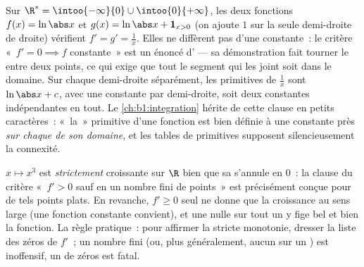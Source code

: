\begin{example}\label{ex:b1:derivative:intervalmatters}
Sur $\R^* = \intoo{-\infty}{0} \cup \intoo{0}{+\infty}$, les deux fonctions
$f(x) = \ln\abs x$ et $g(x) = \ln\abs x + \mathbf{1}_{x>0}$
(on ajoute $1$ sur la seule demi-droite de droite) vérifient $f' = g' =
\frac1x$. Elles ne diffèrent pas d'une constante~: le critère
«~$f' = 0 \implies f$ constante~» est un énoncé d'\emph{}
--- sa démonstration fait tourner le  entre
deux points, ce qui exige que tout le segment qui les joint soit dans le
domaine. Sur chaque demi-droite séparément, les primitives de
$\frac1x$ sont $\ln\abs x + c$, avec une constante par demi-droite,
soit deux constantes indépendantes en tout. Le \cref{ch:b1:integration}
hérite de cette clause en petits caractères~: «~la~» primitive d'une fonction
est bien définie à une constante près \emph{sur chaque  de son
domaine}, et les tables de primitives supposent silencieusement la connexité.
\end{example}

\begin{example}\label{ex:b1:derivative:strictness}
$x \mapsto x^3$ est \emph{strictement} croissante sur $\R$ bien
que sa  s'annule en $0$~: la clause du critère
«~$f' > 0$ sauf en un nombre fini de points~» est précisément conçue
pour de tels points plats. En revanche, $f' \geq 0$ seul ne donne que
la croissance au sens large (une fonction constante convient), et
une  nulle sur tout un  y fige bel et bien la
fonction. La règle pratique~: pour affirmer la stricte
monotonie, dresser la liste des zéros de $f'$~; un nombre fini (ou,
plus généralement, aucun sur un ) est inoffensif, un
 de zéros est fatal.
\end{example}

